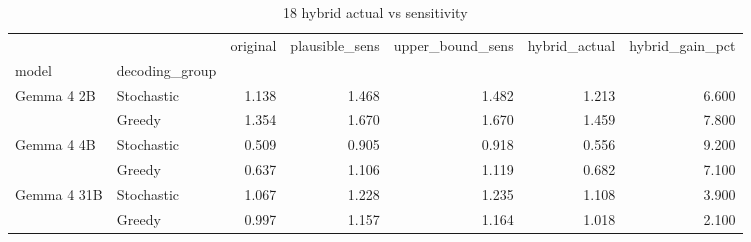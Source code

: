 \begin{table}
\caption{18 hybrid actual vs sensitivity}
\begin{tabular}{llrrrrr}
\toprule
 &  & original & plausible\_sens & upper\_bound\_sens & hybrid\_actual & hybrid\_gain\_pct \\
model & decoding_group &  &  &  &  &  \\
\midrule
\multirow[t]{2}{*}{Gemma 4 2B} & Stochastic & 1.138 & 1.468 & 1.482 & 1.213 & 6.600 \\
 & Greedy & 1.354 & 1.670 & 1.670 & 1.459 & 7.800 \\
\cline{1-7}
\multirow[t]{2}{*}{Gemma 4 4B} & Stochastic & 0.509 & 0.905 & 0.918 & 0.556 & 9.200 \\
 & Greedy & 0.637 & 1.106 & 1.119 & 0.682 & 7.100 \\
\cline{1-7}
\multirow[t]{2}{*}{Gemma 4 31B} & Stochastic & 1.067 & 1.228 & 1.235 & 1.108 & 3.900 \\
 & Greedy & 0.997 & 1.157 & 1.164 & 1.018 & 2.100 \\
\cline{1-7}
\bottomrule
\end{tabular}
\end{table}
